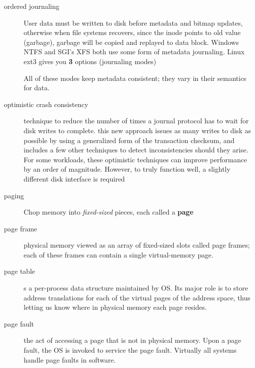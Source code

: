 \begin{description}
\item[ordered journaling] User data must be written to disk before metadata and bitmap updates, otherwise when file systems recovers, since the inode points to old value (garbage), garbage will be copied and replayed to data block. Windows NTFS and SGI’s XFS both use some form of metadata journaling. Linux ext3 gives you \textbf{3} options (journaling modes)
All of these modes keep metadata consistent; they vary in their semantics for data.

\item[optimistic crash consistency] technique to reduce the number of times a journal protocol has to wait for disk writes to complete.  this new approach issues as many writes to disk as possible by using a generalized form of the transaction checksum, and includes a few other techniques to detect inconsistencies should they arise. For some workloads, these optimistic techniques can improve performance by an order of magnitude. However, to truly function well, a slightly different disk interface is required

\item[paging] Chop memory into \emph{fixed-sized} pieces, each called a \textbf{page}

\item[page frame] physical memory viewed as an array of fixed-sized slots called page frames; each of these frames can contain a single virtual-memory page.

\item[page table] s a per-process data structure maintained by OS.  Its major role is to store address translations for each of the virtual pages of the address space, thus letting us know where in physical memory each page resides.

\item[page fault] the act of accessing a page that is not in physical memory.  Upon a page fault, the OS is invoked to service the page fault.  Virtually all systems handle page faults in software.


\end{description}
